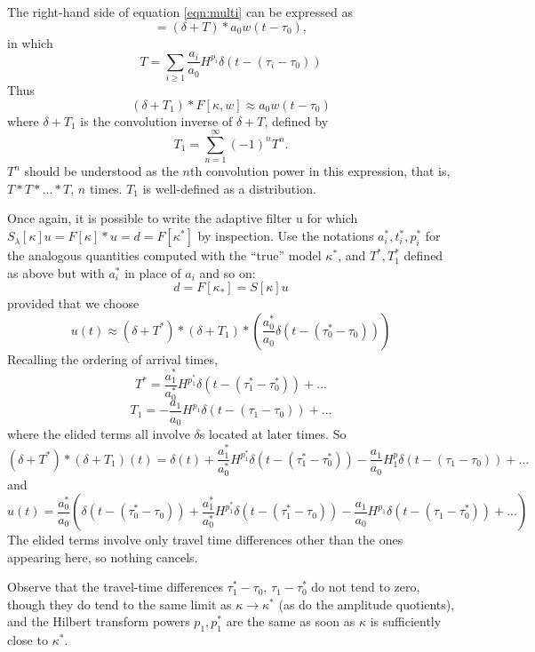 The right-hand side of equation \ref{eqn:multi} can be expressed as
\[
  = (\delta + T) * a_0w(t-\tau_0),
\]
in which 
\[
  T = \sum_{i \ge 1}
  \frac{a_i}{a_0}H^{p_i}\delta(t-(\tau_i-\tau_0))
\]
Thus
\begin{equation}
  \label{eqn:unwrap}
  (\delta +T_1) * F[\kappa,w] \approx  a_0w(t-\tau_0)
\end{equation}
where $\delta + T_1$ is the convolution inverse of $\delta + T$,
defined by 
\[
  T_1 = \sum_{n=1}^{\infty} (-1)^n T^n.
\]
$T^n$ should be understood as the $n$th convolution power in this
expression, that is, $T*T*...*T$, $n$ times. $T_1$ is well-defined as a distribution.

Once again, it is possible to write the adaptive filter u for which $S_{\lambda}[\kappa]u = F[\kappa]*u = d =
F[\kappa^*]$ by inspection. Use the notations $a^*_i, t^*_i, p^*_i$ for
the analogous quantities computed with the ``true'' model $\kappa^*$, and
$T^*, T_1^*$ defined as above but with $a^*_i$ in place of $a_i$ and so
on:
\[
  d = F[\kappa_*]= S[\kappa] u
\]
provided that we choose
\begin{equation}
  \label{eqn:notl2again}
u(t) \approx (\delta + T^*)*(\delta +
T_1)*\left(\frac{a^*_0}{a_0}\delta(t - (\tau^*_0-\tau_0))\right)
\end{equation}
Recalling the ordering of arrival times, 
\[
  T^* = \frac{a^*_1}{a^*_0}H^{p_1^*} \delta(t-(\tau^*_1-\tau^*_0)) + ...
\]
\[
  T_1 = -\frac{a_1}{a_0}H^{p_1} \delta(t-(\tau_1-\tau_0)) + ...
\]
where the elided terms all involve $\delta$s located at later times.
So
\[
  (\delta + T^*)*(\delta + T_1)(t) = \delta(t)  +  \frac{a^*_1}{a^*_0}
  H^{p_1^*}\delta(t-(\tau^*_1-\tau^*_0)) -\frac{a_1}{a_0}H^p_1
  \delta(t-(\tau_1-\tau_0)) + ...
\]
and
\begin{equation}
  \label{eqn:notl2explicit}
  u(t) = \frac{a^*_0}{a_0}\left(\delta(t - (\tau^*_0-\tau_0)) +
    \frac{a^*_1}{a^*_0}H^{p_1^*}\delta(t-(\tau^*_1-\tau_0)) -
    \frac{a_1}{a_0}H^{p_1}\delta(t-(\tau_1-\tau_0^*)) + ...\right)
\end{equation}
The elided terms involve only travel time differences other than the
ones appearing here, so nothing cancels.

Observe that the travel-time differences $\tau^*_1-\tau_0$,
$\tau_1-\tau_0^*$ do not tend to zero, though they do tend to the same
limit as $\kappa \rightarrow \kappa^*$ (as do the amplitude quotients), and the
Hilbert transform powers $p_1, p_1^*$ are the same as soon as $\kappa$ is
sufficiently close to $\kappa^*$.

